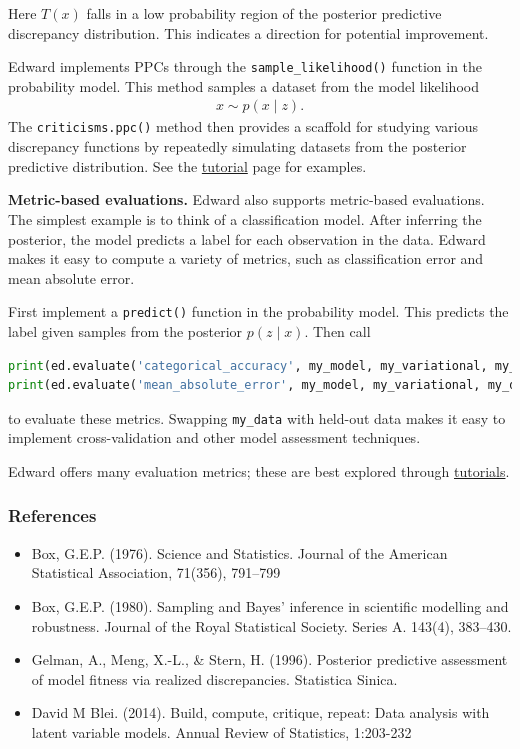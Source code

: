 Here $T(x)$ falls in a low probability region of the posterior
predictive discrepancy distribution. This indicates a direction for potential
improvement.

Edward implements PPCs through the \texttt{sample_likelihood()}
function in the probability model. This method samples a dataset from the
model likelihood
\begin{align*}
  x \sim p(x \mid z).
\end{align*}
The \texttt{criticisms.ppc()} method then provides a scaffold for studying various
discrepancy functions by repeatedly simulating datasets from the posterior
predictive distribution. See the \href{tutorials.html}{tutorial} page for
examples.

\textbf{Metric-based evaluations.} 
Edward also supports metric-based evaluations. The simplest example is to think
of a classification model. After inferring the posterior, the model predicts a
label for each observation in the data. Edward makes it easy to compute a
variety of metrics, such as classification error and mean absolute error.

First implement a \texttt{predict()} function in the probability model. This
predicts the label given samples from the posterior $p(z \mid x)$. Then call
\begin{lstlisting}[language=Python]
print(ed.evaluate('categorical_accuracy', my_model, my_variational, my_data))
print(ed.evaluate('mean_absolute_error', my_model, my_variational, my_data))
\end{lstlisting}
to evaluate these metrics. Swapping \texttt{my_data} with held-out data makes it
easy to implement cross-validation and other model assessment techniques.

Edward offers many evaluation metrics; these are best explored through 
\href{tutorials.html}{tutorials}.

\subsubsection{References}\label{references}

\begin{itemize}
\item 
  Box, G.E.P. (1976). Science and Statistics. Journal of the American
  Statistical Association, 71(356), 791–799
\item
  Box, G.E.P. (1980). Sampling and Bayes' inference in scientific modelling and
  robustness. Journal of the Royal Statistical Society. Series A. 143(4), 383–430.
\item 
  Gelman, A., Meng, X.-L., \& Stern, H. (1996). Posterior predictive assessment
  of model fitness via realized discrepancies. Statistica Sinica.
\item
  David M Blei. (2014). Build, compute, critique, repeat: Data analysis with
  latent variable models. Annual Review of Statistics, 1:203-232
\end{itemize}
